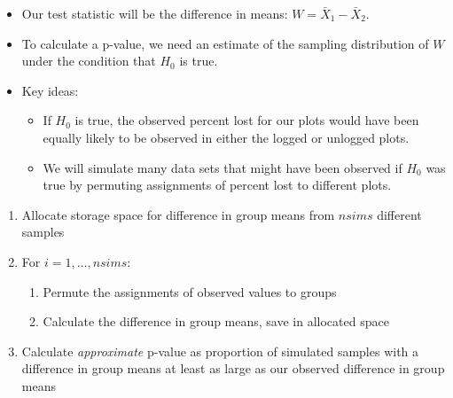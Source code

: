 \documentclass[]{article}
\providecommand{\tightlist}{%
  \setlength{\itemsep}{0pt}\setlength{\parskip}{0pt}}
\begin{document}
\begin{itemize}
\item
  Our test statistic will be the difference in means:
  \(W = \bar{X}_1 - \bar{X}_2\).
\item
  To calculate a p-value, we need an estimate of the sampling
  distribution of \(W\) under the condition that \(H_0\) is true.
\item
  Key ideas:

  \begin{itemize}
  \tightlist
  \item
    If \(H_0\) is true, the observed percent lost for our plots would
    have been equally likely to be observed in either the logged or
    unlogged plots.
  \item
    We will simulate many data sets that might have been observed if
    \(H_0\) was true by permuting assignments of percent lost to
    different plots.
  \end{itemize}
\end{itemize}

\begin{enumerate}
\def\labelenumi{\arabic{enumi}.}
\tightlist
\item
  Allocate storage space for difference in group means from \(nsims\)
  different samples
\item
  For \(i = 1, \ldots, nsims\):

  \begin{enumerate}
  \def\labelenumii{\alph{enumii}.}
  \tightlist
  \item
    Permute the assignments of observed values to groups
  \item
    Calculate the difference in group means, save in allocated space
  \end{enumerate}
\item
  Calculate \emph{approximate} p-value as proportion of simulated
  samples with a difference in group means at least as large as our
  observed difference in group means
\end{enumerate}
\end{document}
